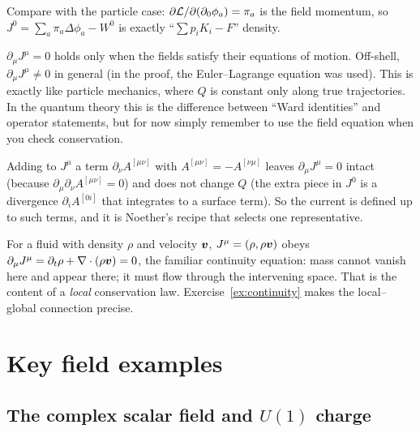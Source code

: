 \documentclass[11pt]{article}
\begin{document}
Compare with the particle case: $\partial\mathcal{L}/\partial(\partial_0\phi_a)=\pi_a$ is the field momentum, so $J^0=\sum_a\pi_a\Delta\phi_a-W^0$ is exactly ``$\sum p_iK_i-F$'' density.

\begin{pitfall}
$\partial_\mu J^\mu=0$ holds only when the fields satisfy their equations of motion. Off-shell, $\partial_\mu J^\mu\neq0$ in general (in the proof, the Euler--Lagrange equation was used). This is exactly like particle mechanics, where $Q$ is constant only along true trajectories. In the quantum theory this is the difference between ``Ward identities'' and operator statements, but for now simply remember to use the field equation when you check conservation.
\end{pitfall}

\begin{pitfall}
Adding to $J^\mu$ a term $\partial_\nu A^{[\mu\nu]}$ with $A^{[\mu\nu]}=-A^{[\nu\mu]}$ leaves $\partial_\mu J^\mu=0$ intact (because $\partial_\mu\partial_\nu A^{[\mu\nu]}=0$) and does not change $Q$ (the extra piece in $J^0$ is a divergence $\partial_iA^{[0i]}$ that integrates to a surface term). So the current is defined up to such terms, and it is Noether's recipe that selects one representative.
\end{pitfall}

\begin{example}
For a fluid with density $\rho$ and velocity $\bm{v}$, $J^\mu=(\rho,\rho\bm{v})$ obeys $\partial_\mu J^\mu=\partial_t\rho+\nabla\cdot(\rho\bm{v})=0$, the familiar continuity equation: mass cannot vanish here and appear there; it must flow through the intervening space. That is the content of a \emph{local} conservation law. Exercise~\ref{ex:continuity} makes the local--global connection precise.
\end{example}

\section{Key field examples}

\subsection{The complex scalar field and $U(1)$ charge}
\end{document}
